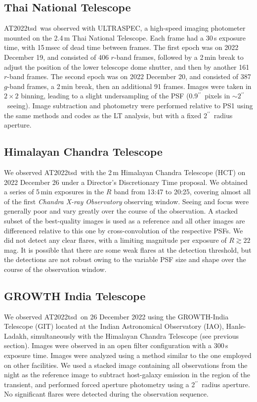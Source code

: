 \documentclass{nature_plusfigure}
\newcommand{\at}{AT2022tsd}
\newcommand{\arcsec}{$^{\prime\prime}$}
\begin{document}
\begin{methods}
\subsection{Thai National Telescope}
\label{sec:ultraspec}

\at\ was observed with ULTRASPEC\cite{Dhillon2014}, a high-speed imaging photometer mounted on the 2.4\,m Thai National Telescope. Each frame had a 30\,s exposure time, with 15\,msec of dead time between frames. The first epoch was on 2022 December 19, and consisted of 406 $r$-band frames, followed by a 2\,min break to adjust the position of the lower telescope dome shutter, and then by another 161 $r$-band frames. The second epoch was on 2022 December 20, and consisted of 387 $g$-band frames, a 2\,min break, then an additional 91 frames.  Images were taken in $2\times2$ binning, leading to a slight undersampling of the PSF (0.9\arcsec\ pixels in $\sim 2$\arcsec\ seeing).  Image subtraction and photometry were performed relative to PS1 using the same methods and codes as the LT analysis, but with a fixed 2\arcsec\ radius aperture.

\subsection{Himalayan Chandra Telescope}
\label{sec:HCT}

We observed \at\ with the 2\,m Himalayan Chandra Telescope (HCT) on 2022 December 26 under a Director's Discretionary Time proposal. We obtained a series of 5\,min exposures in the $R$ band from 13:47 to 20:25, covering almost all of the first {\it Chandra X-ray Observatory} observing window.  Seeing and focus were generally poor and vary greatly over the course of the observation.  A stacked subset of the best-quality images is used as a reference and all other images are differenced relative to this one by cross-convolution of the respective PSFs.   We did not detect any clear flares, with a limiting magnitude per exposure of $R\gtrsim22\,$mag. It is possible that there are some weak flares at the detection threshold, but the detections are not robust owing to the variable PSF size and shape over the course of the observation window.

\subsection{GROWTH India Telescope}
\label{sec:GIT}

We observed \at\ on 26 December 2022 using the GROWTH-India Telescope (GIT\cite{Kumar2022}) located at the Indian Astronomical Observatory (IAO), Hanle-Ladakh, simultaneously with the Himalayan Chandra Telescope (see previous section). Images were observed in an open filter configuration with a 300\,s exposure time. Images were analyzed using a method similar to the one employed on other facilities.  We used a stacked image containing all observations from the night as the reference image to subtract host-galaxy emission in the region of the transient, and performed forced aperture photometry using a 2\arcsec\ radius aperture.  No significant flares were detected during the observation sequence.


\end{methods}
\end{document}
